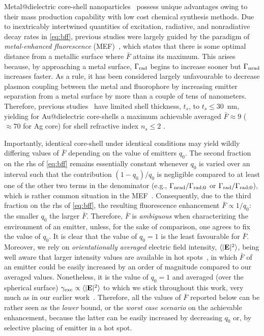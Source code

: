 \documentclass[9pt,twocolumn,twoside]{osajnl}
\newcommand{\vE}{{\bf E}}
\newcommand{\gm}{\gamma}
\newcommand{\Gm}{\Gamma}
\begin{document}
Metal@dielectric core-shell nanoparticles~\cite{Moroz2005,Moroz2005a,Tovmachenko2006,Aslan2007,Reineck2013,Lu2014a,Wang2014a,Pang2015,Planas2016,Walters2018,Niu2018,Camacho2016,Meng2018,Wan2021,Sun20JPCC,Fontaine2020} possess unique advantages owing to their mass production capability with low cost chemical synthesis methods. 
Due to inextricably intertwined quantities of excitation, radiative, and nonradiative decay rates in \eqref{eq:bff}, previous studies were largely guided by the paradigm of {\em metal-enhanced fluorescence} (MEF)~\cite{Lakowicz2008}, which states that there is some optimal distance from a metallic surface where $\bar F$ attains its maximum. This arises because, by approaching a metal surface, $\Gm_{\rm rad}$ begins to increase sooner but $\Gm_{\rm nrad}$ increases faster. As a rule, it has been considered largely unfavourable to decrease plasmon coupling between the metal and fluorophore by increasing emitter separation from a metal surface by more than a couple of tens of nanometers. 
Therefore, previous studies~\cite{Tovmachenko2006,Sun20JPCC,Wan2021} have limited shell thickness, $t_s$, to $t_s\le 30$~nm, yielding for Au@dielectric core-shells a maximum achievable averaged $\bar F\approx 9$ ($\approx 70$ for Ag core) for shell refractive index $n_s\le 2$ \cite{Sun20JPCC}.

Importantly, identical core-shell under identical conditions may yield wildly differing values of $\bar F$ depending on the value of emitters $q_0$.
The second fraction on the rhs of \eqref{eq:bff} remains essentially constant whenever $q_0$ is varied over an interval such that the contribution $(1-q_0)/q_0$ is negligible compared to at least one of the other two terms in the denominator (e.g., $\Gamma_{\rm nrad}/\Gamma_{{\rm rad};0}$ or $\Gamma_{\rm rad}/\Gamma_{{\rm rad};0}$), which is rather common situation in the MEF~\cite{Moroz2005a,Anger2006,Sun20JPCC}.
Consequently, due to the third fraction on the rhs of \eqref{eq:bff}, the resulting fluorescence enhancement $\bar F\propto 1/q_0$: the smaller $q_0$ the larger $\bar F$.
Therefore, $\bar F$ is {\em ambiguous} when characterizing the environment of an emitter, unless, for the sake of comparison,
one agrees to fix the value of $q_0$. It is clear that the value of $q_0=1$ is the least favourable for $\bar F$.
Moreover, we rely on \textit{orientationally averaged} electric field intensity, $\langle |\vE|^2 \rangle$, being well aware that larger intensity values are available in hot spots~\cite{Wan2021}, in which $\bar F$ of an emitter could be easily increased by an order of magnitude compared to our averaged values.
Nonetheless, it is the value of $q_0=1$ and averaged (over the spherical surface) $\gm_{\rm exc} \propto \langle |\vE|^2 \rangle$ to which we stick throughout this work, very much as in our earlier work~\cite{Sun20JPCC}. 
Therefore, all the values of $\bar F$ reported below can be rather seen as the {\em lower} bound, or the \textit{worst case scenario} on the achievable enhancement, because the latter can be easily increased by decreasing $q_0$ or, by selective placing of emitter in a hot spot.
\end{document}
